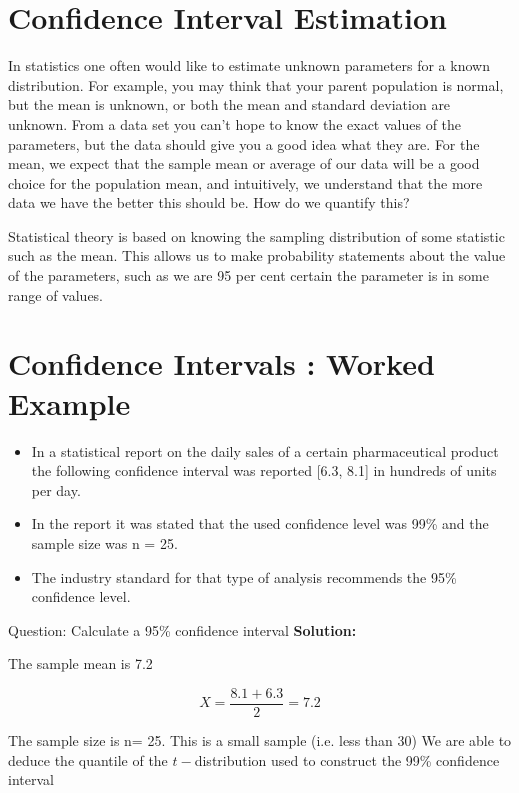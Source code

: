 \section{Confidence Interval Estimation}
In statistics one often would like to estimate unknown parameters for a known distribution. For example, you may think that your parent population is normal, but the mean is unknown, or both the mean and standard deviation are unknown. From a data set you can't hope to know the exact values of the parameters, but the data should give you a good idea what they are. For the mean, we expect that the sample mean or average of our data will be a good choice for the population mean, and intuitively, we understand that the more data we have the better this should be. How do we quantify this?

Statistical theory is based on knowing the sampling distribution of some statistic such as the mean. This allows us to make probability statements about the value of the parameters, such as we are 95 per cent certain the parameter is in some range of values.


\section*{Confidence Intervals : Worked Example}

\begin{itemize} 
\item In a statistical report on the daily sales of a certain pharmaceutical product the following confidence interval was reported [6.3, 8.1] in hundreds of units per day.
 
\item In the report it was stated that the used confidence level was 99\% and the sample size was n = 25. 
\item The industry standard for that type of analysis recommends the 95\% confidence level.
\end{itemize}
Question: Calculate a 95\% confidence interval
\textbf{Solution:}
 
The sample mean is 7.2
 
       \[X=\frac{8.1 + 6.3}{2}=7.2\]
 
The sample size is n= 25. This is a small sample (i.e. less than 30)
We are able to deduce the quantile of the $t-$distribution used to construct the 99\% confidence interval
 
